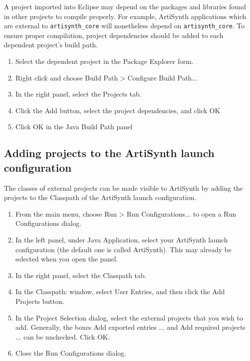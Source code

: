 \documentclass{article}
\begin{document}
A project imported into Eclipse may depend on the packages and
libraries found in other projects to compile properly.  For example,
ArtiSynth applications which are external to {\tt artisynth\_core}
will nonetheless depend on {\tt artisynth\_core}. To ensure
proper compilation, project dependencies should be added
to each dependent project's build path.

\begin{enumerate}

\item Select the dependent project in the {\sf Package Explorer} form.

\item Right click and choose {\sf Build Path > Configure Build Path...} 

\item In the right panel, select the {\sf Projects} tab.

\item Click the {\sf Add} button, select the project dependencies,
      and click {\sf OK}

\item Click {\sf OK} in the Java Build Path panel

\end{enumerate}

\subsection{Adding projects to the ArtiSynth launch configuration}
\label{AddingProjectsToLaunch}

The classes of external projects can be made visible to ArtiSynth by
adding the projects to the Classpath of the ArtiSynth launch
configuration.

\begin{enumerate}

\item From the main menu, choose {\sf Run > Run Configurations...}
to open a {\sf Run Configurations} dialog.

\item In the left panel, under {\sf Java Application}, select your
ArtiSynth launch configuration (the default one is called {\sf
ArtiSynth}). This may already be selected when you open the panel.

\item In the right panel, select the {\sf Classpath} tab.

\item In the {\sf Classpath:} window, select {\sf User Entries},
and then click the {\sf Add Projects} button.

\item In the {\sf Project Selection} dialog, select the external
projects that you wish to add. Generally, the boxes
{\sf Add exported entries ...} and {\sf Add required projects ...}
can be unchecked. Click {\sf OK}.

\item Close the {\sf Run Configurations} dialog.

\end{enumerate}
\end{document}
